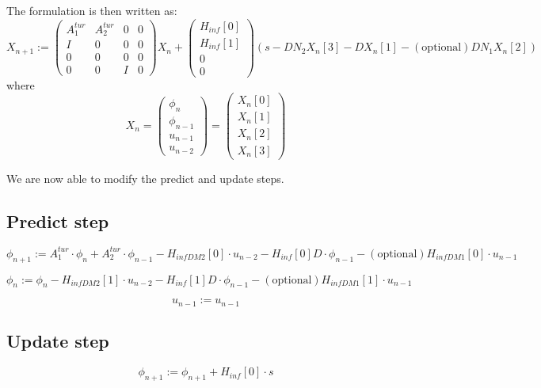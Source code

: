 \documentclass[a4,10pt]{article}
\begin{document}
The formulation is then written as:
\begin{equation}
X_{n+1}:=\begin{pmatrix}
A^{tur}_1 &A^{tur}_2&0&0\\
I&0&0&0\\
0&0&0&0\\
0&0&I&0
\end{pmatrix}X_n+\begin{pmatrix}H_{inf}[0]\\H_{inf}[1]\\0\\0\end{pmatrix}(s-DN_2X_n[3]-DX_n[1]
-\mathrm{(optional)} DN_1X_n[2])
\label{eq:Kalman2}
\end{equation}
where
\begin{equation}
X_n=\begin{pmatrix}
\phi_{n}\\
\phi_{n-1}\\
u_{n-1}\\
u_{n-2}\end{pmatrix}=\begin{pmatrix}
X_n[0]\\X_n[1]\\X_n[2]\\X_n[3]
\end{pmatrix}
\end{equation}

We are now able to modify the predict and update steps.


\subsection{Predict step}
\begin{equation}
\phi_{n+1} := A^{tur}_1 \cdot \phi_{n}+ A^{tur}_2 \cdot \phi_{n-1} -
H_{infDM2}[0] \cdot u_{n-2} - H_{inf}[0]D\cdot\phi_{n-1}
-\mathrm{(optional)} H_{infDM1}[0] \cdot u_{n-1}
\end{equation}

\begin{equation}
\phi_n := \phi_{n} - H_{infDM2}[1] \cdot u_{n-2}-
H_{inf}[1]D\cdot\phi_{n-1} - \mathrm{(optional)} H_{infDM1}[1] \cdot u_{n-1}
\end{equation}

\begin{equation}
u_{n-1} :=u_{n-1}
\end{equation}


\subsection{Update step}
\begin{equation}
\phi_{n+1} := \phi_{n+1} + H_{inf}[0] \cdot s
\end{equation}
\end{document}
